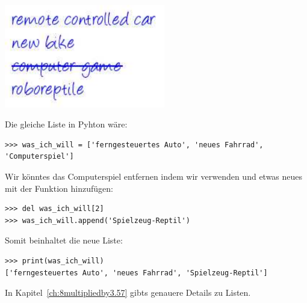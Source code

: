 \begin{center}
\includegraphics*[width=70mm]{images/list}
\end{center}

\noindent
Die gleiche Liste in Pyhton wäre:

\begin{Verbatim}[frame=single]
>>> was_ich_will = ['ferngesteuertes Auto', 'neues Fahrrad', 'Computerspiel']
\end{Verbatim}

\noindent
Wir könntes das Computerspiel entfernen indem wir  verwenden und etwas neues mit der Funktion  hinzufügen:

\begin{Verbatim}[frame=single]
>>> del was_ich_will[2]
>>> was_ich_will.append('Spielzeug-Reptil')
\end{Verbatim}

\noindent
Somit beinhaltet die neue Liste:

\begin{Verbatim}[frame=single]
>>> print(was_ich_will)
['ferngesteuertes Auto', 'neues Fahrrad', 'Spielzeug-Reptil']
\end{Verbatim}

\noindent
In Kapitel~\ref{ch:8multipliedby3.57} gibts genauere Details zu Listen.

